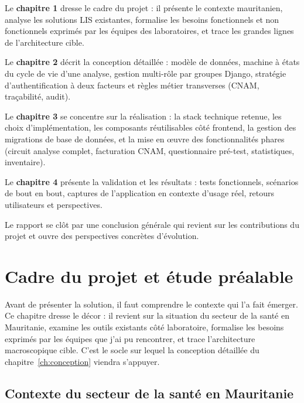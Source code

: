 \documentclass[12pt, a4paper, oneside]{report}
\begin{document}
Le \textbf{chapitre 1} dresse le cadre du projet : il présente le
contexte mauritanien, analyse les solutions LIS existantes, formalise
les besoins fonctionnels et non fonctionnels exprimés par les équipes
des laboratoires, et trace les grandes lignes de l'architecture cible.

Le \textbf{chapitre 2} décrit la conception détaillée : modèle de
données, machine à états du cycle de vie d'une analyse, gestion
multi-rôle par groupes Django, stratégie d'authentification à deux
facteurs et règles métier transverses (CNAM, traçabilité, audit).

Le \textbf{chapitre 3} se concentre sur la réalisation : la stack
technique retenue, les choix d'implémentation, les composants
réutilisables côté frontend, la gestion des migrations de base de
données, et la mise en \oe{}uvre des fonctionnalités phares (circuit
analyse complet, facturation CNAM, questionnaire pré-test, statistiques,
inventaire).

Le \textbf{chapitre 4} présente la validation et les résultats : tests
fonctionnels, scénarios de bout en bout, captures de l'application en
contexte d'usage réel, retours utilisateurs et perspectives.

Le rapport se clôt par une conclusion générale qui revient sur les
contributions du projet et ouvre des perspectives concrètes
d'évolution.

\newpage

\chapter{Cadre du projet et étude préalable}

\noindent
Avant de présenter la solution, il faut comprendre le contexte qui l'a
fait émerger. Ce chapitre dresse le décor : il revient sur la
situation du secteur de la santé en Mauritanie, examine les outils
existants côté laboratoire, formalise les besoins exprimés par les
équipes que j'ai pu rencontrer, et trace l'architecture macroscopique
cible. C'est le socle sur lequel la conception détaillée du
chapitre~\ref{ch:conception} viendra s'appuyer.

\section{Contexte du secteur de la santé en Mauritanie}
\end{document}
